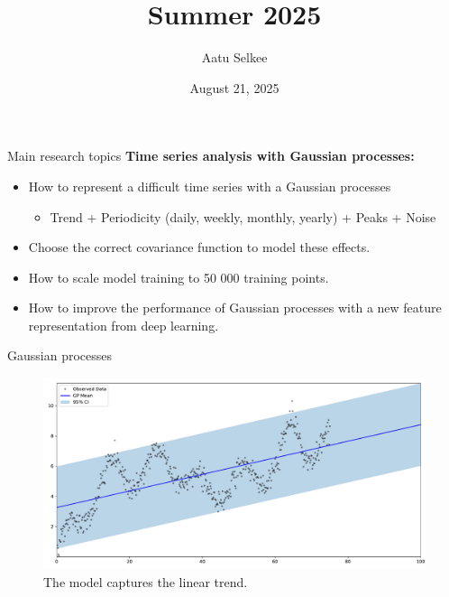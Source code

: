 \documentclass{beamer}
\title{Summer 2025}
\author{Aatu Selkee}
\date{August 21, 2025}
\begin{document}
\frame{\titlepage}


\begin{frame}{Main research topics}
    \textbf{Time series analysis with Gaussian processes:}
    \begin{itemize}
        \item How to represent a difficult time series with a Gaussian processes
        \begin{itemize}
            \item Trend + Periodicity (daily, weekly, monthly, yearly) + Peaks + Noise
        \end{itemize}
        \item Choose the correct covariance function to model these effects.
        \item How to scale model training to 50 000 training points.
        \item How to improve the performance of Gaussian processes with a new feature representation from deep learning.
    \end{itemize}
\end{frame}

\begin{frame}{Gaussian processes}
    \begin{figure}
        \centering
        \includegraphics[width=\textwidth]{../Images/EndOfSummerPresentation/TSPredDemoLinear.pdf}
        \caption{The model captures the linear trend.}
    \end{figure}
\end{frame}
\end{document}
